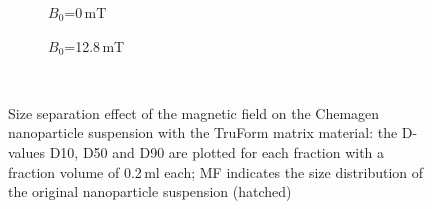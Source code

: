 \begin{figure}[H]
          \begin{subfigure}{0.49\textwidth}
                  \flushleft
                  \caption{$B_{0}$=0\,mT}\label{subfig:chemagen_size_0mT}
          \end{subfigure}\hfill
        \begin{subfigure}{0.49\textwidth}
                \flushright
                \caption{$B_{0}$=12.8\,mT}\label{subfig:chemagen_size_128mT}
        \end{subfigure}
        \\        
        \caption[Size separation effect of the magnetic field on the Chemagen nanoparticle suspension with the TruForm matrix material]{Size separation effect of the magnetic field on the Chemagen nanoparticle suspension with the TruForm matrix material: the D-values D10, D50 and D90 are plotted for each fraction with a fraction volume of 0.2\,ml each; MF indicates the size distribution of the original nanoparticle suspension (hatched)}
        \label{fig:chemagen_size_separation}
  \end{figure}

